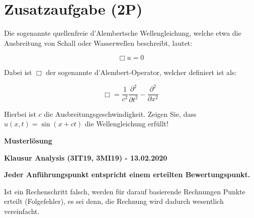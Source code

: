 \documentclass[12pt]{article}
\begin{document}
\newpage
\section*{Zusatzaufgabe (2P)}

Die sogenannte quellenfreie d'Alembertsche Wellengleichung, welche etwa die Ausbreitung von Schall oder Wasserwellen beschreibt, lautet:

$$\Box u = 0$$


Dabei ist $\Box$ der sogenannte d'Alembert-Operator, welcher definiert ist als:

$$\Box = \frac{1}{c^2}\frac{\partial^2}{\partial t^2} - \frac{\partial^2}{\partial x^2}$$

Hierbei ist $c$ die Ausbreitungsgeschwindigkeit. Zeigen Sie, dass $u(x,t) = \sin(x+ct)$ die Wellengleichung erfüllt!

\label{LastTask}

\newpage

\begin{center}
{\bf {\large Musterlösung}}
\end{center}

\begin{center}
{\bf {\large Klausur Analysis (3IT19, 3MI19) - 13.02.2020}}
\end{center}

\begin{center}
\textbf{Jeder Anführungspunkt entspricht einem erteilten Bewertungspunkt.} 

Ist ein Rechenschritt falsch, werden für darauf basierende Rechnungen Punkte erteilt (Folgefehler), es sei denn, die Rechnung wird dadurch wesentlich vereinfacht. 
\end{center}
\end{document}
